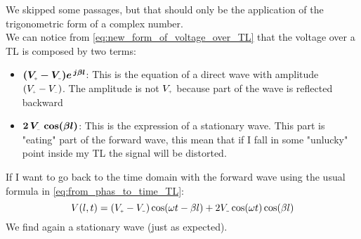   We skipped some passages, but that should only be the application of the trigonometric form of a complex number.\\
  We can notice from \cref{eq:new_form_of_voltage_over_TL} that the voltage over a TL is composed by two terms:
  \begin{itemize}
      \item $\bm{(V\bottomPlus - V\bottomMinus)e^{\,j\beta l}}$: This is the equation of a direct wave with amplitude $(V\bottomPlus - V\bottomMinus)$. The amplitude is not $V\bottomPlus$ because part of the wave is reflected backward
      \item $\bm{2\,V\bottomMinus\,\cos(\beta l)}$: This is the expression of a stationary wave. This part is "eating" part of the forward wave, this mean that if I fall in some "unlucky" point inside my TL the signal will be distorted.
  \end{itemize}

If I want to go back to the time domain with the forward wave using the usual formula in \cref{eq:from_phas_to_time_TL}:
\begin{equation}
    V(l,t)=(V\bottomPlus - V\bottomMinus)\cos(\omega t-\beta l)+2V\bottomMinus\cos(\omega t)\cos(\beta l)
\end{equation}
We find again a stationary wave (just as expected).
